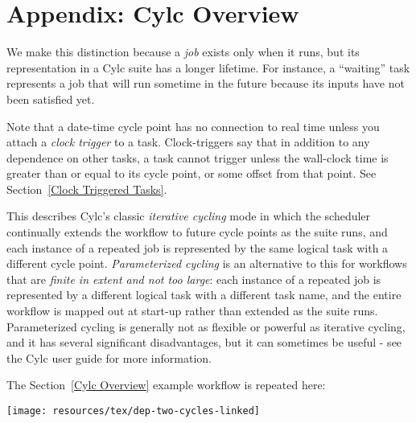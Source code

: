 \section{Appendix: Cylc Overview}
\label{Appendix Cylc Overview}


 We make this distinction because a {\em job}
exists only when it runs, but its representation in a Cylc suite has a longer
lifetime.  For instance, a ``waiting'' task represents a job that will run
sometime in the future because its inputs have not been satisfied yet.

  Note that a date-time cycle point has no connection to real
time unless you attach a {\em clock trigger} to a task. Clock-triggers
say that in addition to any dependence on other tasks, a task cannot trigger
unless the wall-clock time is greater than or equal to its cycle point, or some
offset from that point. See Section~\ref{Clock Triggered Tasks}.

  This describes
Cylc's classic {\em iterative cycling} mode in which the scheduler continually
extends the workflow to future cycle points as the suite runs, and each
instance of a repeated job is represented by the same logical task with a
different cycle point. {\em Parameterized cycling} is an alternative to this
for workflows that are {\em finite in extent and not too large}: each instance
of a repeated job is represented by a different logical task with a different
task name, and the entire workflow is mapped out at start-up rather than
extended as the suite runs. Parameterized cycling is generally not as flexible
or powerful as iterative cycling, and it has several significant disadvantages,
but it can sometimes be useful - see the Cylc user guide for more information. 

The Section~\ref{Cylc Overview} example workflow is repeated here:
\begin{center}
    \texttt{[image: resources/tex/dep-two-cycles-linked]}
\end{center}

